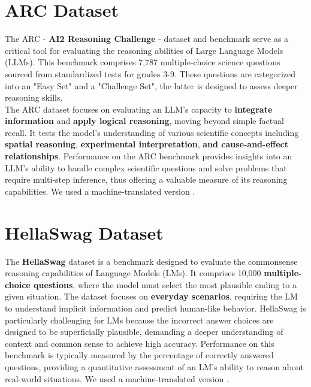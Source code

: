 \documentclass{article}
\begin{document}
	\section{ARC Dataset}
	The ARC - \textbf{AI2 Reasoning Challenge} - dataset and benchmark serve as a critical tool for evaluating the reasoning abilities of Large Language Models (LLMs). This benchmark comprises 7,787 multiple-choice science questions sourced from standardized tests for grades 3-9.  These questions are categorized into an "Easy Set" and a "Challenge Set", the latter is designed to assess deeper reasoning skills.  \\
	The ARC dataset focuses on evaluating an LLM's capacity to \textbf{integrate information} and \textbf{apply logical reasoning}, moving beyond simple factual recall.  It tests the model's understanding of various scientific concepts including \textbf{spatial reasoning}, \textbf{experimental interpretation}, \textbf{and cause-and-effect relationships}.  Performance on the ARC benchmark provides insights into an LLM's ability to handle complex scientific questions and solve problems that require multi-step inference, thus offering a valuable measure of its reasoning capabilities.
	We used a machine-translated version \cite{dac2023okapi}.
	
	\section{HellaSwag Dataset}
	The \textbf{HellaSwag} dataset is a benchmark designed to evaluate the commonsense reasoning capabilities of Language Models (LMs). It comprises 10,000 \textbf{multiple-choice questions}, where the model must select the most plausible ending to a given situation.  The dataset focuses on \textbf{everyday scenarios}, requiring the LM to understand implicit information and predict human-like behavior.  HellaSwag is particularly challenging for LMs because the incorrect answer choices are designed to be superficially plausible, demanding a deeper understanding of context and common sense to achieve high accuracy.  Performance on this benchmark is typically measured by the percentage of correctly answered questions, providing a quantitative assessment of an LM's ability to reason about real-world situations.
	We used a machine-translated version \cite{dac2023okapi}.
	
	
	
\end{document}
